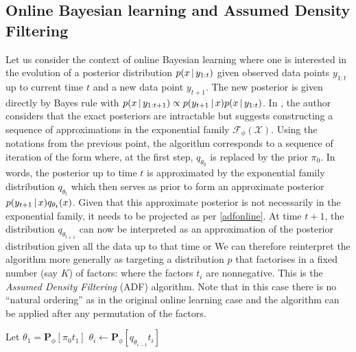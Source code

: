\subsection{Online Bayesian learning and Assumed Density Filtering}
%
Let us consider the context of online Bayesian learning where one is interested in the evolution of a posterior distribution $p(x\,|\, y_{1:t})$ given observed \iid data points $y_{1:t}$ up to current time $t$ and a new \iid data point $y_{t+1}$. 
The new posterior is given directly by Bayes rule with $p(x\,|\, y_{1:t+1})\propto p(y_{t+1}\,|\, x) p(x\,|\, y_{1:t})$. 
In \citet{opper98}, the author considers that the exact posteriors are intractable but suggests constructing a sequence of approximations in the exponential family $\mathcal F_{\phi}(\mathcal X)$. 
Using the notations from the previous point, the algorithm corresponds to a sequence of iteration of the form
%
%
where, at the first step, $q_{\theta_{0}}$ is replaced by the prior $\pi_{0}$. In words, the posterior up to time $t$ is approximated by the exponential family distribution $q_{\theta_{t}}$ which then serves as prior to form an approximate posterior $p(y_{t+1}\,|\, x)q_{\theta_{t}}(x)$. 
Given that this approximate posterior is not necessarily in the exponential family, it needs to be projected as per \eqref{adfonline}. 
At time $t+1$, the distribution $q_{\theta_{t+1}}$ can now be interpreted as an approximation of the posterior distribution given all the data up to that time or 
%
%
We can therefore reinterpret the algorithm more generally as targeting a distribution $p$ that factorises in a fixed number (say $K$) of factors: 
%
%
where the factors $t_i$ are nonnegative. This is the \emph{Assumed Density Filtering} (ADF) algorithm. Note that in this case there is no ``natural ordering'' as in the original online learning case and the algorithm can be applied after any permutation of the factors.


\begin{algorithm}[!h]\small
	\caption{\label{alg:adf}}
	\begin{algorithmic}[1]
	\State Let $\theta_{1}=\mathbf P_{\phi}[\pi_{0}t_{1}]$
		\State $\theta_{i}\leftarrow\mathbf P_{\phi}[q_{\theta_{i-1}}t_{i}]$ 
	\EndFor\\
	\end{algorithmic}
\end{algorithm} 

